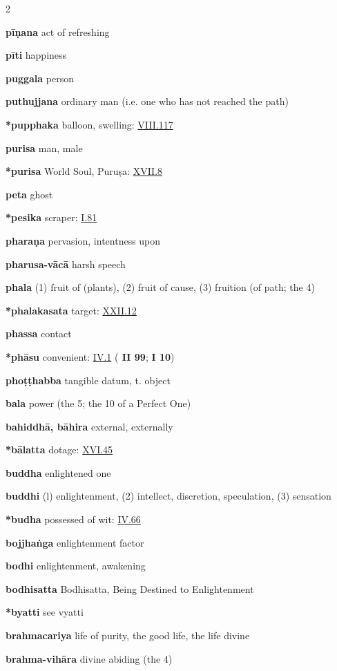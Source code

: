\begin{multicols}{2}
\begin{vismHanging}
\par\textbf{pīṇana} act of refreshing
\par\textbf{pīti} happiness
\par\textbf{puggala} person
\par\textbf{puthujjana} ordinary man (i.e. one who has not reached the path)
\par\textbf{*pupphaka} balloon, swelling: \hyperlink{VIII.117}{VIII.117}{}
\par\textbf{purisa} man, male
\par\textbf{*purisa} World Soul, Puruṣa: \hyperlink{XVII.8}{XVII.8}{}
\par\textbf{peta} ghost
\par\textbf{*pesika} scraper: \hyperlink{I.81}{I.81}{}
\par\textbf{pharaṇa} pervasion, intentness upon
\par\textbf{pharusa-vācā} harsh speech
\par\textbf{phala} (1) fruit of (plants), (2) fruit of cause, (3) fruition (of path; the 4) 
\par\textbf{*phalakasata} target: \hyperlink{XXII.12}{XXII.12}{} 
\par\textbf{phassa} contact
\par\textbf{*phāsu} convenient: \hyperlink{IV.1}{IV.1}{} (\textbf{\cite{D} II 99}; \textbf{\cite{M} I 10})
\par\textbf{phoṭṭhabba} tangible datum, t. object
\par\textbf{bala} power (the 5; the 10 of a Perfect One) 
\par\textbf{bahiddhā, bāhira} external, externally 
\par\textbf{*bālatta} dotage: \hyperlink{XVI.45}{XVI.45}{}
\par\textbf{buddha} enlightened one
\par\textbf{buddhi} (l) enlightenment, (2) intellect, discretion, speculation, (3) sensation 
\par\textbf{*budha} possessed of wit: \hyperlink{IV.66}{IV.66}{}
\par\textbf{bojjhaṅga} enlightenment factor
\par\textbf{bodhi} enlightenment, awakening 
\par\textbf{bodhisatta} Bodhisatta, Being Destined to Enlightenment
\par\textbf{*byatti} see vyatti
\par\textbf{brahmacariya} life of purity, the good life, the life divine 
\par\textbf{brahma-vihāra} divine abiding (the 4)

\end{vismHanging}
\end{multicols}
